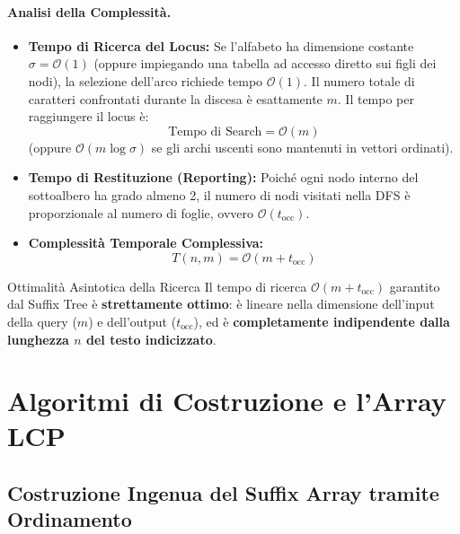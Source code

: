 \paragraph{Analisi della Complessit\`a.}
\begin{itemize}
  \item \textbf{Tempo di Ricerca del Locus:} Se l'alfabeto ha dimensione costante $\sigma = \mathcal{O}(1)$ (oppure impiegando una tabella ad accesso diretto sui figli dei nodi), la selezione dell'arco richiede tempo $\mathcal{O}(1)$. Il numero totale di caratteri confrontati durante la discesa \`e esattamente $m$. Il tempo per raggiungere il locus \`e:
  \begin{equation}
    \text{Tempo di Search} = \mathcal{O}(m)
  \end{equation}
  (oppure $\mathcal{O}(m \log \sigma)$ se gli archi uscenti sono mantenuti in vettori ordinati).
  \item \textbf{Tempo di Restituzione (Reporting):} Poich\'e ogni nodo interno del sottoalbero ha grado almeno 2, il numero di nodi visitati nella DFS \`e proporzionale al numero di foglie, ovvero $\mathcal{O}(t_{\text{occ}})$.
  \item \textbf{Complessit\`a Temporale Complessiva:}
  \begin{equation}
    T(n, m) = \mathcal{O}(m + t_{\text{occ}})
  \end{equation}
\end{itemize}

\begin{noteblock}{Ottimalit\`a Asintotica della Ricerca}
Il tempo di ricerca $\mathcal{O}(m + t_{\text{occ}})$ garantito dal Suffix Tree \`e \textbf{strettamente ottimo}: \`e lineare nella dimensione dell'input della query ($m$) e dell'output ($t_{\text{occ}}$), ed \`e \textbf{completamente indipendente dalla lunghezza $n$ del testo indicizzato}.
\end{noteblock}

\FloatBarrier
\section{Algoritmi di Costruzione e l'Array LCP}
\label{sec:costruzione-array-lcp}

\FloatBarrier
\subsection{Costruzione Ingenua del Suffix Array tramite Ordinamento}
\label{subsec:costruzione-ingenua-sa}

